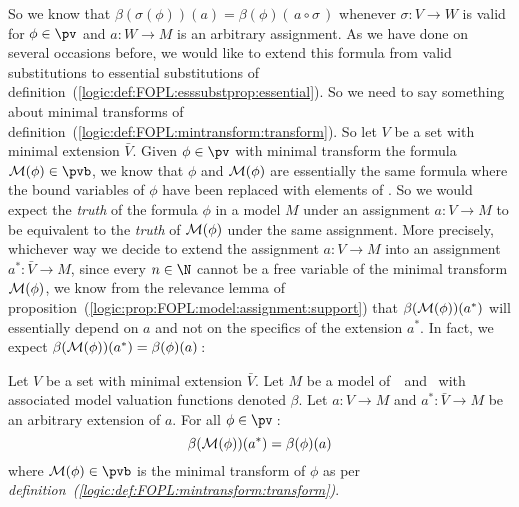 So we know that
$\beta(\sigma(\phi))(a)=\beta(\phi)(\,a\circ\sigma\,)$ whenever
$\sigma:V\to W$ is valid for $\phi\in\pv$ and $a:W\to M$ is an
arbitrary assignment. As we have done on several occasions before,
we would like to extend this formula from valid substitutions to
essential substitutions of
definition~(\ref{logic:def:FOPL:esssubstprop:essential}). So we need
to say something about minimal transforms of
definition~(\ref{logic:def:FOPL:mintransform:transform}). So let $V$
be a set with minimal extension $\bar{V}$. Given $\phi\in\pv$ with
minimal transform the formula ${\cal M}(\phi)\in\pvb$, we know that
$\phi$ and ${\cal M}(\phi)$ are essentially the same formula where
the bound variables of $\phi$ have been replaced with elements of
\N. So we would expect the {\em truth} of the formula $\phi$ in a
model $M$ under an assignment $a:V\to M$ to be equivalent to the
{\em truth} of ${\cal M}(\phi)$ under the same assignment. More
precisely, whichever way we decide to extend the assignment $a:V\to
M$ into an assignment $a^{*}:\bar{V}\to M$, since every $n\in\N$
cannot be a free variable of the minimal transform ${\cal M}(\phi)$,
we know from the relevance lemma of
proposition~(\ref{logic:prop:FOPL:model:assignment:support}) that
$\beta({\cal M}(\phi))(a^{*})$ will essentially depend on $a$ and
not on the specifics of the extension $a^{*}$. In fact, we expect
$\beta({\cal M}(\phi))(a^{*})=\beta(\phi)(a)$\,:
\begin{prop}\label{logic:prop:FOPL:model:min:transform}
Let $V$ be a set with minimal extension $\bar{V}$. Let $M$ be a
model of\, \pv\ and \pvb\ with associated model valuation functions
denoted $\beta$. Let $a:V\to M$ and $a^{*}:\bar{V}\to M$ be an
arbitrary extension of $a$. For all $\phi\in\pv$\,:
    \begin{equation}\label{logic:eqn:FOPL:model:min:transform:1}
    \beta({\cal M}(\phi))(a^{*})=\beta(\phi)(a)
    \end{equation}
where ${\cal M}(\phi)\in\pvb$ is the minimal transform of $\phi$ as
per {\em definition~(\ref{logic:def:FOPL:mintransform:transform})}.
\end{prop}
